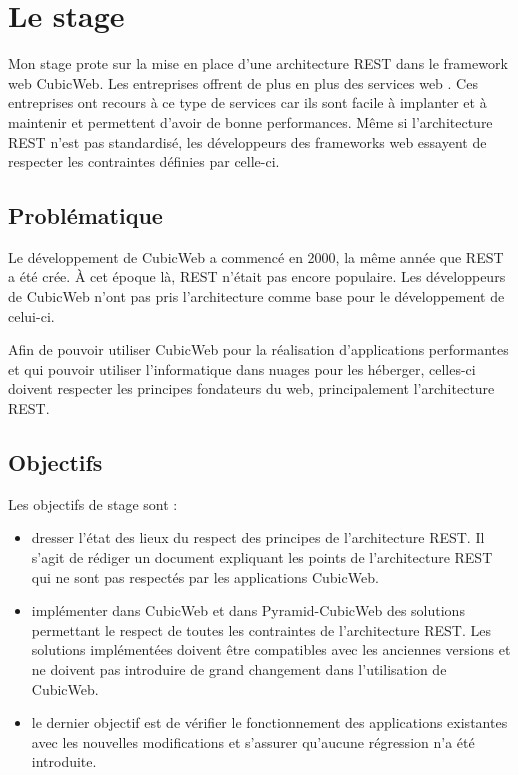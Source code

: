 \chapter{Le stage}
Mon stage prote sur la mise en place d'une architecture REST dans le framework web CubicWeb. Les entreprises offrent de plus en plus des services web . Ces entreprises ont recours à ce type de services car ils sont facile à implanter et à maintenir et permettent d'avoir de bonne performances. Même si l'architecture REST n'est pas standardisé, les développeurs des frameworks web essayent de respecter les contraintes définies par celle-ci.   
\section{Problématique}
Le développement de CubicWeb a commencé en 2000, la même année que REST a été crée. \`A cet époque là, REST n'était pas encore populaire. Les développeurs de CubicWeb n'ont pas pris l'architecture comme base pour le développement de celui-ci.  

Afin de pouvoir utiliser CubicWeb pour la réalisation d'applications 	performantes et qui pouvoir utiliser l'informatique dans nuages pour les héberger, celles-ci doivent respecter les principes fondateurs du web, principalement l'architecture REST.


\section{Objectifs}
Les objectifs de stage sont :
\begin{itemize}
	\item dresser l'état des lieux du respect des principes de l'architecture REST. Il s'agit de rédiger un document expliquant les points de l'architecture REST qui ne sont pas respectés par les applications CubicWeb.
	
	\item implémenter dans CubicWeb et dans Pyramid-CubicWeb des solutions permettant le respect de toutes les contraintes de l'architecture REST.  Les solutions implémentées doivent être compatibles avec les anciennes versions et ne doivent pas introduire de grand changement dans l'utilisation de CubicWeb.
	
	\item le dernier objectif est de vérifier le fonctionnement des applications existantes avec les nouvelles modifications et s'assurer qu'aucune régression n'a été introduite. 
\end{itemize}